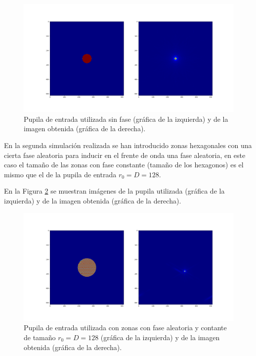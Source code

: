 \documentclass[twoside]{article}
\begin{document}
					\begin{figure}[H]
						\centering
						\includegraphics[scale=0.3]{Fig/Hola.png}
						\caption{\label{Img:airy-normal}Pupila de entrada utilizada sin  fase (gráfica de la izquierda) y de la imagen obtenida (gráfica de la derecha).}
					\end{figure}

				En la segunda simulación realizada se han introducido zonas hexagonales con una cierta fase aleatoria para inducir en el frente de onda una fase aleatoria, en este caso el tamaño de las zonas con fase constante (tamaño de los hexagonos) es el mismo que el de la pupila de entrada $r_0 = D = 128$.

				En la Figura \ref{Img:airy-fase} se muestran imágenes de la pupila utilizada (gráfica de la izquierda) y de la imagen obtenida (gráfica de la derecha).

					\begin{figure}[H]
						\centering
						\includegraphics[scale=0.3]{Fig/Airy.png}
						\caption{\label{Img:airy-fase}Pupila de entrada utilizada con zonas con fase aleatoria y contante de tamaño $r_0 = D = 128$ (gráfica de la izquierda) y de la imagen obtenida (gráfica de la derecha).}
					\end{figure}
\end{document}
